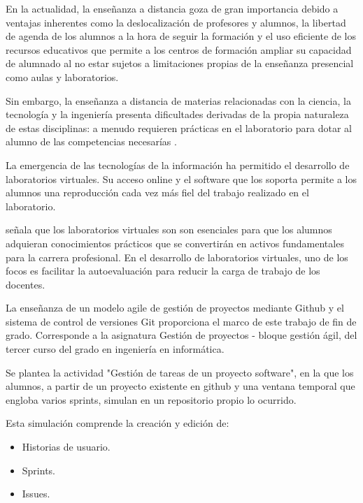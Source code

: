 
En la actualidad, la enseñanza a distancia goza de gran importancia debido a ventajas inherentes como la deslocalización de profesores y alumnos, la libertad de agenda de los alumnos a la hora de seguir la formación y el uso eficiente de los recursos educativos que permite a los centros de formación ampliar su capacidad de alumnado al no estar sujetos a limitaciones propias de la enseñanza presencial como aulas y laboratorios.

Sin embargo, la enseñanza a distancia de materias relacionadas con la ciencia, la tecnología y  la ingeniería  presenta dificultades derivadas de la propia naturaleza de estas disciplinas: a menudo requieren prácticas en el laboratorio para dotar al alumno de las competencias necesarías .

La emergencia de las tecnologías de la información ha permitido el desarrollo de laboratorios virtuales. Su acceso online y el software que los soporta permite a los alumnos una reproducción cada vez más fiel del trabajo realizado en el laboratorio.

\cite{tejado2018}  señala que los laboratorios virtuales son son esenciales para que los alumnos adquieran conocimientos prácticos que se convertirán en  activos fundamentales para la  carrera profesional. En el desarrollo de laboratorios virtuales, uno de los focos es facilitar la autoevaluación para reducir la carga de trabajo de los docentes.

La enseñanza de un modelo agile de gestión de proyectos mediante Github y el sistema de control de versiones Git proporciona el marco de este trabajo de fin de grado. Corresponde a la asignatura Gestión de proyectos - bloque gestión ágil, del tercer curso del grado en ingeniería en informática.

Se plantea la actividad "Gestión de tareas de un proyecto software", en la que los alumnos, a partir de un proyecto existente en github y una ventana temporal que engloba varios sprints, simulan en un repositorio propio lo ocurrido.

Esta simulación comprende la creación y edición de:

\begin{itemize}
	\item Historias de usuario.
	\item Sprints.
	\item Issues.
\end{itemize}



 